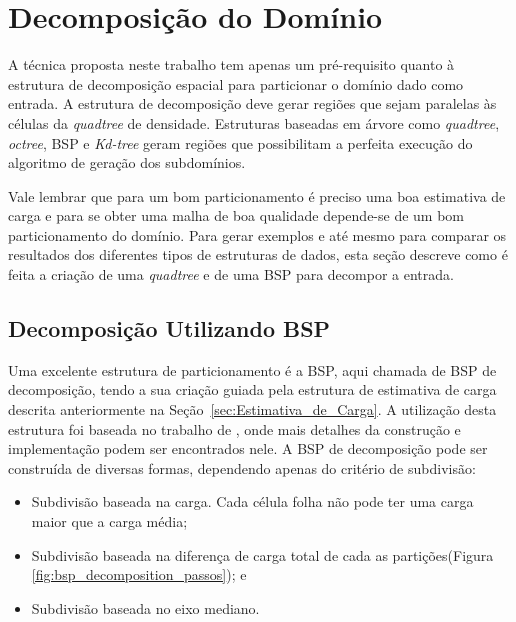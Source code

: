\section{Decomposição do Domínio}\label{sec:Decomposicao_dominio}

A técnica proposta neste trabalho tem apenas um pré-requisito quanto à estrutura de decomposição espacial para particionar o domínio dado como entrada. A estrutura de decomposição deve gerar regiões que sejam paralelas às células da \textit{quadtree} de densidade. Estruturas baseadas em árvore como \textit{quadtree}, \textit{octree}, BSP e \textit{Kd-tree} geram regiões que possibilitam a perfeita execução do algoritmo de geração dos subdomínios.

Vale lembrar que para um bom particionamento é preciso uma boa estimativa de carga e para se obter uma malha de boa qualidade depende-se de um bom particionamento do domínio. Para gerar exemplos e até mesmo para comparar os resultados dos diferentes tipos de estruturas de dados, esta seção descreve como é feita a criação de uma \textit{quadtree} e de uma BSP para decompor a entrada.

\subsection{Decomposição Utilizando BSP}

Uma excelente estrutura de particionamento é a BSP, aqui chamada de BSP de decomposição, tendo a sua criação guiada pela estrutura de estimativa de carga descrita anteriormente na Seção~\ref{sec:Estimativa_de_Carga}. A utilização desta estrutura foi baseada no trabalho de \cite{bib:RepMarkos13}, onde mais detalhes da construção e implementação podem ser encontrados nele. A BSP de decomposição pode ser construída de diversas formas, dependendo apenas do critério de subdivisão:


\begin{itemize}
	\item Subdivisão baseada na carga. Cada célula folha não pode ter uma carga maior que a carga média;
	\item Subdivisão baseada na diferença de carga total de cada as partições(Figura \ref{fig:bsp_decomposition_passos}); e 
	\item Subdivisão baseada no eixo mediano.
\end{itemize}


